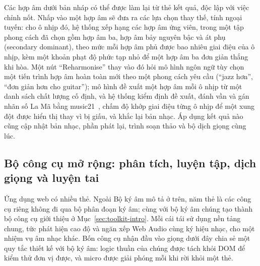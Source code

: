 \documentclass[12pt,a4paper]{article}
\begin{document}
Các hợp âm dưới bản nháp có thể được làm lại từ thẻ kết quả, độc lập với việc chỉnh
nốt. Nhấp vào một hợp âm sẽ đưa ra các lựa chọn thay thế, tính ngoại tuyến: cho ô
nhịp đó, hệ thống xếp hạng các hợp âm ứng viên, trong một tập phong cách đã chọn gồm
hợp âm ba, hợp âm bảy nguyên bậc và át phụ (secondary dominant), theo mức mỗi hợp âm
phủ được bao nhiêu giai điệu của ô nhịp, kèm một khoản phạt độ phức tạp nhỏ để một
hợp âm ba đơn giản thắng khi hòa. Một nút ``Reharmonise'' thay vào đó hỏi mô hình
ngôn ngữ tùy chọn một tiến trình hợp âm hoàn toàn mới theo một phong cách yêu cầu
(``jazz hơn'', ``đơn giản hơn cho guitar''); mô hình đề xuất một hợp âm mỗi ô nhịp
từ một danh sách chất lượng cố định, và hệ thống kiểm định đề xuất, đánh vần và gán
nhãn số La Mã bằng music21~\cite{music21}, chấm độ khớp giai điệu từng ô nhịp để một
xung đột được hiển thị thay vì bị giấu, và khắc lại bản nhạc. Áp dụng kết quả nào
cũng cập nhật bản nhạc, phần phát lại, trình soạn thảo và bộ dịch giọng cùng lúc.

\subsection{Bộ công cụ mở rộng: phân tích, luyện tập, dịch giọng và luyện tai}
\label{sec:toolkit}

Ứng dụng web có nhiều thẻ. Ngoài Bộ ký âm mô tả ở trên, năm thẻ là các công cụ
riêng không đi qua bộ phân đoạn ký âm; cùng với bộ ký âm chúng tạo thành bộ công cụ
giới thiệu ở Mục~\ref{sec:toolkit-intro}. Mỗi cái tái sử dụng nền tảng chung, tức
phát hiện cao độ và ngăn xếp Web Audio cùng ký hiệu nhạc, cho một nhiệm vụ âm nhạc
khác. Bốn công cụ nhận đầu vào giọng dưới đây chia sẻ một quy tắc thiết kế với bộ ký
âm: logic thuần của chúng được tách khỏi DOM để kiểm thử đơn vị được, và micro được
giải phóng mỗi khi rời khỏi một thẻ.
\end{document}
